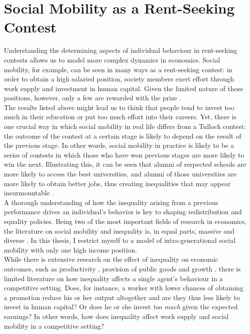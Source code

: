 \section{Social Mobility as a Rent-Seeking Contest}
\label{sec:soc_mob}

Understanding the determining aspects of individual behaviour in rent-seeking contests allows us to model more complex dynamics in economics. Social mobility, for example, can be seen in many ways as a rent-seeking contest: in order to obtain a high salaried position, society members exert effort through work supply and investment in human capital. Given the limited nature of those positions, however, only a few are rewarded with the prize \citep{burkhauser2011}.\\

The results listed above might lead us to think that people tend to invest too much in their education or put too much effort into their careers. Yet, there is one crucial way in which social mobility in real life differs from a Tullock contest: the outcome of the contest at a certain stage is likely to depend on the result of the previous stage. In other words, social mobility in practice is likely to be a series of contests in which those who have won previous stages are more likely to win the next. Illustrating this, it can be seen that alumni of respected schools are more likely to access the best universities, and alumni of those universities are more likely to obtain better jobs, thus creating inequalities that may appear insurmountable \citep{sewell1971}.\\

A thorough understanding of how the inequality arising from a previous performance drives an individual's behavior is key to shaping redistribution and equality policies. Being two of the most important fields of research in economics, the literature on social mobility and inequality is, in equal parts, massive and diverse \citep{nolan2011, atkinson2015, lipset2018, fields1999}. In this thesis, I restrict myself to a model of intra-generational social mobility with only one high income position.\\ 

While there is extensive research on the effect of inequality on economic outcomes, such as productivity \citep{persson1994, ku2012}, provision of public goods \citep{fehr1999} and growth \citep{ehrhart2009}, there is limited literature on how inequality affects a single agent's behaviour in a competitive setting. Does, for instance, a worker with lower chances of obtaining a promotion reduce his or her output altogether and are they thus less likely to invest in human capital? Or does he or she invest \textit{too much} given the expected earnings? In other words, how does inequality affect work supply and social mobility in a competitive setting?\\

